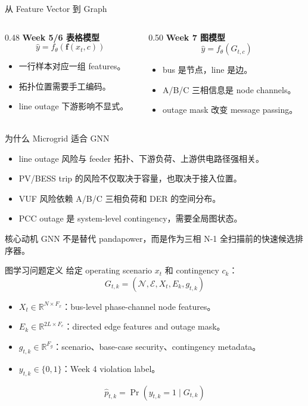 \documentclass[aspectratio=169,11pt]{beamer}
\newcommand{\R}{\mathbb{R}}
\begin{document}
\begin{frame}{从 Feature Vector 到 Graph}
\begin{columns}
\begin{column}{0.48\textwidth}
\textbf{Week 5/6 表格模型}
\[
\hat y=f_\theta(\mathbf f(x_t,c))
\]
\begin{itemize}
  \item 一行样本对应一组 features。
  \item 拓扑位置需要手工编码。
  \item line outage 下游影响不显式。
\end{itemize}
\end{column}
\begin{column}{0.50\textwidth}
\textbf{Week 7 图模型}
\[
\hat y=f_\theta(G_{t,c})
\]
\begin{itemize}
  \item bus 是节点，line 是边。
  \item A/B/C 三相信息是 node channels。
  \item outage mask 改变 message passing。
\end{itemize}
\end{column}
\end{columns}
\end{frame}

\begin{frame}{为什么 Microgrid 适合 GNN}
\begin{itemize}
  \item line outage 风险与 feeder 拓扑、下游负荷、上游供电路径强相关。
  \item PV/BESS trip 的风险不仅取决于容量，也取决于接入位置。
  \item VUF 风险依赖 A/B/C 三相负荷和 DER 的空间分布。
  \item PCC outage 是 system-level contingency，需要全局图状态。
\end{itemize}
\begin{block}{核心动机}
GNN 不是替代 pandapower，而是作为三相 N-1 全扫描前的快速候选排序器。
\end{block}
\end{frame}

\begin{frame}{图学习问题定义}
给定 operating scenario $x_t$ 和 contingency $c_k$：
\[
G_{t,k}=\left(\mathcal N,\mathcal E, X_t, E_k, g_{t,k}\right)
\]
\begin{itemize}
  \item $X_t\in\R^{N\times F_x}$：bus-level phase-channel node features。
  \item $E_k\in\R^{2L\times F_e}$：directed edge features and outage mask。
  \item $g_{t,k}\in\R^{F_g}$：scenario、base-case security、contingency metadata。
  \item $y_{t,k}\in\{0,1\}$：Week 4 violation label。
\end{itemize}
\[
\hat p_{t,k}=\Pr(y_{t,k}=1\mid G_{t,k})
\]
\end{frame}
\end{document}
